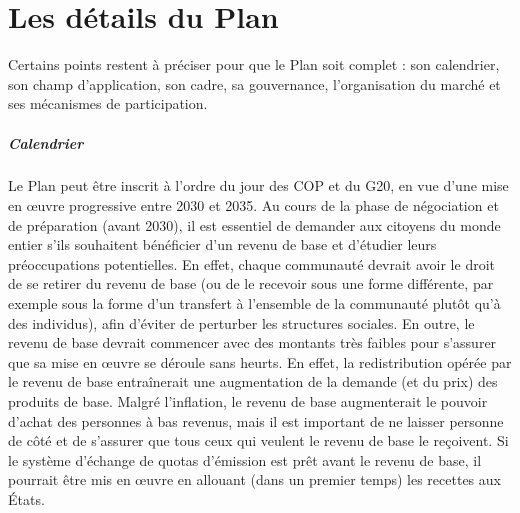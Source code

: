\documentclass[a5paper,french,openany]{memoir}
\begin{document}
\chapter{Les détails du Plan\label{ch:details}} 

Certains points restent à préciser pour que le Plan soit complet : son calendrier, son champ d'application, son cadre, sa gouvernance, l'organisation du marché et ses mécanismes de participation. 

\paragraph{Calendrier} 
Le Plan peut être inscrit à l'ordre du jour des COP et du G20, en vue d'une mise en œuvre progressive entre 2030 et 2035. Au cours de la phase de négociation et de préparation (avant 2030), il est essentiel de demander aux citoyens du monde entier s'ils souhaitent bénéficier d'un revenu de base et d'étudier leurs préoccupations potentielles. En effet, chaque communauté devrait avoir le droit de se retirer du revenu de base (ou de le recevoir sous une forme différente, par exemple sous la forme d'un transfert à l'ensemble de la communauté plutôt qu'à des individus), afin d'éviter de perturber les structures sociales. En outre, le revenu de base devrait commencer avec des montants très faibles pour s'assurer que sa mise en œuvre se déroule sans heurts. En effet, la redistribution opérée par le revenu de base entraînerait une augmentation de la demande (et du prix) des produits de base. Malgré l'inflation, le revenu de base augmenterait le pouvoir d'achat des personnes à bas revenus, mais il est important de ne laisser personne de côté et de s'assurer que tous ceux qui veulent le revenu de base le reçoivent. Si le système d'échange de quotas d'émission est prêt avant le revenu de base, il pourrait être mis en œuvre en allouant (dans un premier temps) les recettes aux États.
\end{document}
